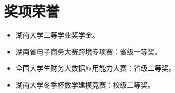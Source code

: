 \documentclass{resume-photo}
\begin{document}
\section{奖项荣誉}
\begin{itemize}
  \item 湖南大学二等学业奖学金。
  \item 湖南省电子商务大赛跨境专项赛：省级一等奖。
  \item 全国大学生财务大数据应用能力大赛：省级二等奖。
  \item 湖南大学冬季杯数学建模竞赛：校级二等奖。
\end{itemize}
\end{document}
